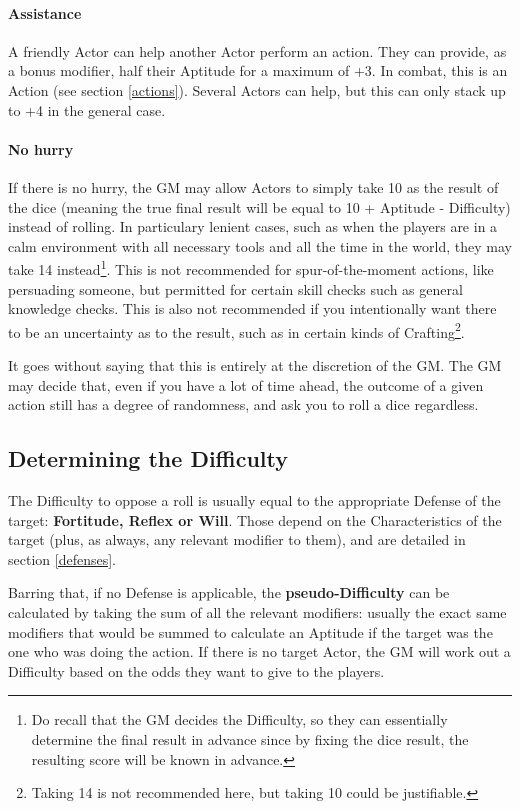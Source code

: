 \paragraph{Assistance} 

A friendly Actor can help another Actor perform an action. They can provide, as a bonus modifier, half their Aptitude for a maximum of +3. In combat, this is an Action (see section \ref{actions}). Several Actors can help, but this can only stack up to +4 in the general case.

\paragraph{No hurry} 

If there is no hurry, the GM may allow Actors to simply take 10 as the result of the dice (meaning the true final result will be equal to 10 + Aptitude - Difficulty) instead of rolling. In particulary lenient cases, such as when the players are in a calm environment with all necessary tools and all the time in the world, they may take 14 instead\footnote{Do recall that the GM decides the Difficulty, so they can essentially determine the final result in advance since by fixing the dice result, the resulting score will be known in advance.}. This is not recommended for spur-of-the-moment actions, like persuading someone, but permitted for certain skill checks such as general knowledge checks. This is also not recommended if you intentionally want there to be an uncertainty as to the result, such as in certain kinds of Crafting\footnote{Taking 14 is not recommended here, but taking 10 could be justifiable.}.

It goes without saying that this is entirely at the discretion of the GM. The GM may decide that, even if you have a lot of time ahead, the outcome of a given action still has a degree of randomness, and ask you to roll a dice regardless.


\subsection{Determining the Difficulty}
\label{difficulty}

The Difficulty to oppose a roll is usually equal to the appropriate Defense of the target: \textbf{Fortitude, Reflex or Will}. Those depend on the Characteristics of the target (plus, as always, any relevant modifier to them), and are detailed in section \ref{defenses}. 

Barring that, if no Defense is applicable, the \textbf{pseudo-Difficulty} can be calculated by taking the sum of all the relevant modifiers: usually the exact same modifiers that would be summed to calculate an Aptitude if the target was the one who was doing the action. If there is no target Actor, the GM will work out a Difficulty based on the odds they want to give to the players.

